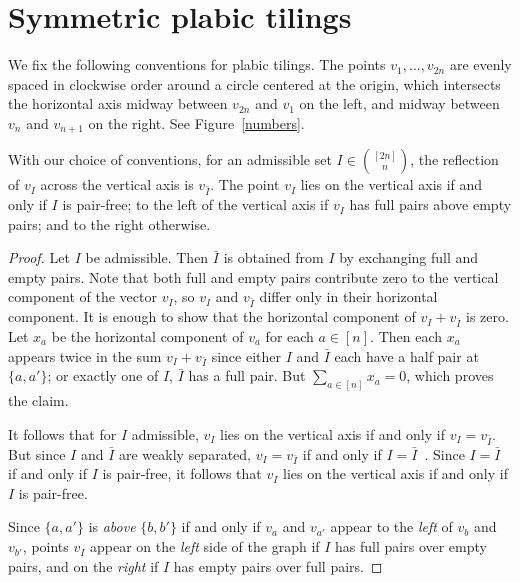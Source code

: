 \documentclass[ALCO,ThmDefs,Unicode,epreuves]{cedram}
\begin{document}
\section{Symmetric plabic tilings}
\label{sym_tilings}

We fix the following conventions for plabic tilings. The points $v_1,\ldots,v_{2n}$ are evenly spaced in 
clockwise order around a circle centered at the origin, which intersects the horizontal axis midway between $v_{2n}$ and $v_1$ on the left, and midway between $v_n$ and $v_{n+1}$ on the right. See Figure~\ref{numbers}. 

\begin{lemm}
\label{reflect_vert}
With our choice of conventions, for an admissible set $I \in \binom{[2n]}{n}$, the reflection of $v_I$ across the vertical axis is $v_{\bar{I}}$. The point $v_I$ lies on the vertical axis if and only if $I$ is pair-free; to the left of the vertical axis if $v_I$ has full pairs above empty pairs; and to the right otherwise.
\end{lemm}

\begin{proof}
Let $I$ be admissible. Then $\bar{I}$ is obtained from $I$ by exchanging full and empty pairs.
Note that both full and empty pairs contribute zero to the vertical component of the vector $v_I$, so $v_I$ and $v_{\bar{I}}$ differ only in their horizontal component. It is enough to show that the horizontal component of $v_I + v_{\bar{I}}$ is zero. Let $x_a$ be the horizontal component of $v_a$ for each $a \in [n]$. Then each $x_a$ appears twice in the sum $v_{I} + v_{\bar{I}}$ since either $I$ and $\bar{I}$ each have a half pair at $\{a,a'\}$; or exactly one of $I$, $\bar{I}$ has a full pair. 
But $\sum_{a \in [n]}x_a = 0$, which proves the claim.


It follows that for $I$ admissible, $v_I$ lies on the vertical axis if and only if $v_I = v_{\bar{I}}$. But since $I$ and $\bar{I}$ are weakly separated, $v_{I} = v_{\bar{I}}$ if and only if $I = \bar{I}$~\cite{OPS15}. Since $I = \bar{I}$ if and only if $I$ is pair-free, it follows that $v_I$ lies on the vertical axis if and only if $I$ is pair-free.

Since $\{a,a'\}$ is \emph{above} $\{b,b'\}$ if and only if $v_a$ and $v_{a'}$ appear to the \emph{left} of $v_b$ and $v_{b'}$, points $v_I$ appear on the \emph{left} side of the graph if $I$ has full pairs over empty pairs, and on the \emph{right} if $I$ has empty pairs over full pairs. \end{proof}
\end{document}
